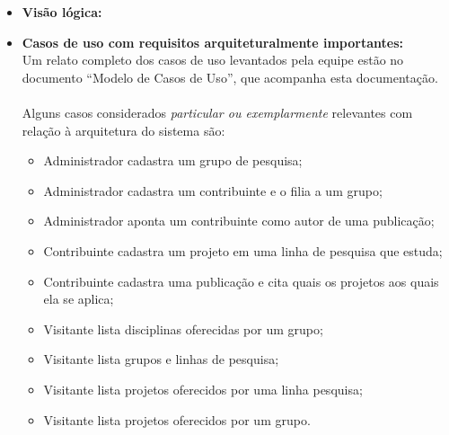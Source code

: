 \documentclass[11pt, a4paper]{article}
\begin{document}
        \begin{itemize}
            \item \textbf{Visão lógica:}
                \\

            
            \item \textbf{Casos de uso com requisitos arquiteturalmente
            importantes:}
                \\
                Um relato completo dos casos de uso levantados pela equipe
                estão no documento ``Modelo de Casos de Uso'', que acompanha
                esta documentação.
                \\\\
                Alguns casos considerados \textit{particular ou exemplarmente}
                relevantes com relação à arquitetura do sistema são:
                \begin{itemize}
                    \item {Administrador cadastra um grupo de pesquisa;}
                    \item {Administrador cadastra um contribuinte e o filia a
                           um grupo;}
                    \item {Administrador aponta um contribuinte como autor de
                           uma publicação;}
                    \item {Contribuinte cadastra um projeto em uma linha de
                           pesquisa que estuda;}
                    \item {Contribuinte cadastra uma publicação e cita quais
                           os projetos aos quais ela se aplica;}
                    \item {Visitante lista disciplinas oferecidas por um grupo;}
                    \item {Visitante lista grupos e linhas de pesquisa;}
                    \item {Visitante lista projetos oferecidos por uma linha
                           pesquisa;}
                    \item {Visitante lista projetos oferecidos por um grupo.}
                    
                \end{itemize}
        \end{itemize}
\end{document}
